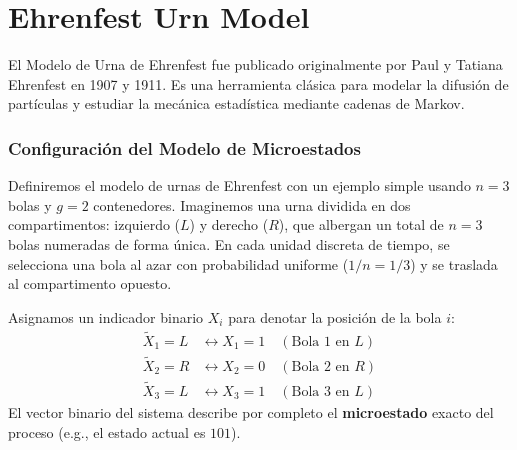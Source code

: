 \section{Ehrenfest Urn Model}
El Modelo de Urna de Ehrenfest fue publicado originalmente por Paul y Tatiana Ehrenfest en 1907 y 1911. Es una herramienta clásica para modelar la difusión de partículas y estudiar la mecánica estadística mediante cadenas de Markov. \\


\subsubsection{Configuración del Modelo de Microestados}
\noindent
Definiremos el modelo de urnas de Ehrenfest con un ejemplo simple usando $n=3$ bolas y $g=2$ contenedores. Imaginemos una urna dividida en dos compartimentos: izquierdo ($L$) y derecho ($R$), que albergan un total de $n=3$ bolas numeradas de forma única. En cada unidad discreta de tiempo, se selecciona una bola al azar con probabilidad uniforme ($1/n = 1/3$) y se traslada al compartimento opuesto.

\begin{center}
\begin{minipage}{0.4\textwidth}
    \centering
\end{minipage}
\begin{minipage}{0.5\textwidth}
    Asignamos un indicador binario $X_i$ para denotar la posición de la bola $i$:
    \begin{align*}
        \widetilde{X}_1 = L &\longleftrightarrow X_1 = 1 \quad (\text{Bola 1 en } L) \\
        \widetilde{X}_2 = R &\longleftrightarrow X_2 = 0 \quad (\text{Bola 2 en } R) \\
        \widetilde{X}_3 = L &\longleftrightarrow X_3 = 1 \quad (\text{Bola 3 en } L)
    \end{align*}
    El vector binario del sistema describe por completo el \textbf{microestado} exacto del proceso (e.g., el estado actual es $101$).
\end{minipage}
\end{center}

